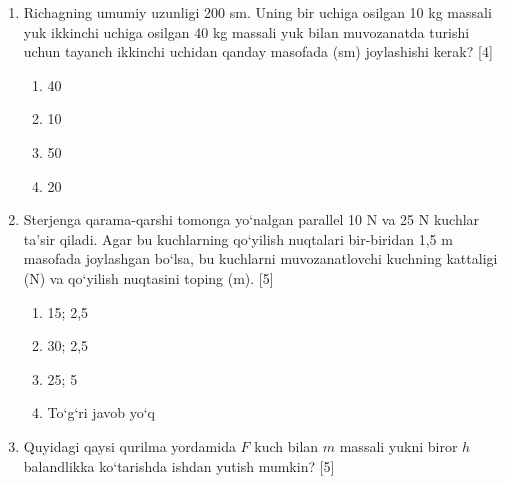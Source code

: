 \begin{enumerate}
\item Richagning umumiy uzunligi 200 sm. Uning bir uchiga osilgan 10 kg massali yuk ikkinchi uchiga osilgan 40 kg massali yuk bilan muvozanatda turishi uchun tayanch ikkinchi uchidan qanday masofada (sm) joylashishi kerak? [4]
\begin{enumerate}[label=\Alph*)]
\item 40
\item 10
\item 50
\item 20
\end{enumerate}

\item Sterjenga qarama-qarshi tomonga yo‘nalgan parallel 10 N va 25 N kuchlar ta’sir qiladi. Agar bu kuchlarning qo‘yilish nuqtalari bir-biridan 1,5 m masofada joylashgan bo‘lsa, bu kuchlarni muvozanatlovchi kuchning kattaligi (N) va qo‘yilish nuqtasini toping (m). [5]
\begin{enumerate}[label=\Alph*)]
\item 15; 2,5
\item 30; 2,5
\item 25; 5
\item To‘g‘ri javob yo‘q
\end{enumerate}

\item Quyidagi qaysi qurilma yordamida $F$ kuch bilan $m$ massali yukni biror $h$ balandlikka ko‘tarishda ishdan yutish mumkin? [5]

\end{enumerate}
